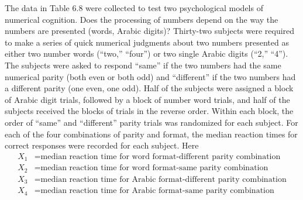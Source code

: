 The data in Table 6.8 were collected to test two psychological models of numerical cognition.
Does the processing of numbers depend on the way the numbers are presented (words, Arabic digits)?
Thirty-two subjects were required to make a series of quick numerical judgments about two numbers presented as either two number
words (``two,'' ``four'') or two single Arabic digits (``2,'' ``4'').
The subjects were asked to respond ``same'' if the two numbers had the same numerical parity (both even or both odd) and ``different'' if the two numbers had a different parity (one even, one odd).
Half of the subjects were assigned a block of Arabic digit trials, followed by a block of number word trials, and half of the subjects received the blocks of trials in the reverse order.
Within each block, the order of ``same'' and ``different'' parity
trials was randomized for each subject.
For each of the four combinations of parity and format, the median reaction times for correct responses were recorded for each
subject.
Here
\begin{align*}
    X_{1} &= \text{median reaction time for word format-different parity combination} \\
    X_{2} &= \text{median reaction time for word format-same parity combination} \\
    X_{3} &= \text{median reaction time for Arabic format-different parity combination} \\
    X_{4} &= \text{median reaction time for Arabic format-same parity combination}
\end{align*}

